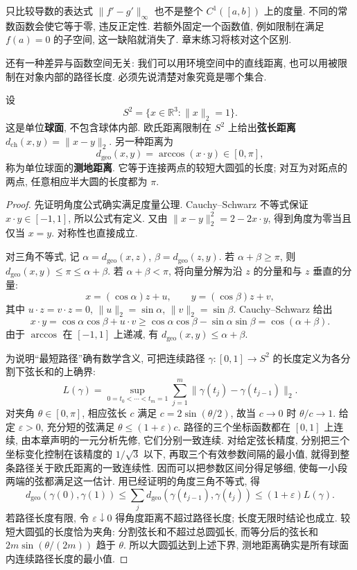只比较导数的表达式 $\lVert f'-g'\rVert_\infty$ 也不是整个 $C^1([a,b])$ 上的度量. 不同的常数函数会使它等于零, 违反正定性. 若额外固定一个函数值, 例如限制在满足 $f(a)=0$ 的子空间, 这一缺陷就消失了. 章末练习将核对这个区别.

\label{ch:metric:sphere}
还有一种差异与函数空间无关: 我们可以用环境空间中的直线距离, 也可以用被限制在对象内部的路径长度. 必须先说清楚对象究竟是哪个集合.

\begin{proposition}[单位球面上的两种距离]\label{ch:metric:sphere-example}
设
\[
 S^2=\{x\in\mathbb{R}^3:\lVert x\rVert_2=1\}.
\]
这是单位\textbf{球面}, 不包含球体内部. 欧氏距离限制在 $S^2$ 上给出\textbf{弦长距离} $d_{\mathrm{ch}}(x,y)=\lVert x-y\rVert_2$. 另一种距离为
\[
 d_{\mathrm{geo}}(x,y)=\arccos(x\cdot y)\in[0,\pi],
\]
称为单位球面的\textbf{测地距离}. 它等于连接两点的较短大圆弧的长度; 对互为对跖点的两点, 任意相应半大圆的长度都为 $\pi$.
\end{proposition}
\begin{proof}
先证明角度公式确实满足度量公理. Cauchy--Schwarz 不等式保证 $x\cdot y\in[-1,1]$, 所以公式有定义. 又由
$\lVert x-y\rVert_2^2=2-2x\cdot y$, 得到角度为零当且仅当 $x=y$. 对称性也直接成立.

对三角不等式, 记 $\alpha=d_{\mathrm{geo}}(x,z)$, $\beta=d_{\mathrm{geo}}(z,y)$. 若 $\alpha+\beta\ge\pi$, 则 $d_{\mathrm{geo}}(x,y)\le\pi\le\alpha+\beta$. 若 $\alpha+\beta<\pi$, 将向量分解为沿 $z$ 的分量和与 $z$ 垂直的分量:
\[
 x=(\cos\alpha)z+u,\qquad
 y=(\cos\beta)z+v,
\]
其中 $u\cdot z=v\cdot z=0$, $\lVert u\rVert_2=\sin\alpha$, $\lVert v\rVert_2=\sin\beta$. Cauchy--Schwarz 给出
\[
 x\cdot y=\cos\alpha\cos\beta+u\cdot v
 \ge\cos\alpha\cos\beta-\sin\alpha\sin\beta
 =\cos(\alpha+\beta).
\]
由于 $\arccos$ 在 $[-1,1]$ 上递减, 有 $d_{\mathrm{geo}}(x,y)\le\alpha+\beta$.

为说明``最短路径''确有数学含义, 可把连续路径 $\gamma:[0,1]\to S^2$ 的长度定义为各分割下弦长和的上确界:
\[
 L(\gamma)=\sup_{0=t_0<\cdots<t_m=1}
 \sum_{j=1}^m\lVert\gamma(t_j)-\gamma(t_{j-1})\rVert_2.
\]
对夹角 $\theta\in[0,\pi]$, 相应弦长 $c$ 满足 $c=2\sin(\theta/2)$, 故当 $c\to0$ 时 $\theta/c\to1$. 给定 $\varepsilon>0$, 充分短的弦满足 $\theta\le(1+\varepsilon)c$. 路径的三个坐标函数都在 $[0,1]$ 上连续, 由本章声明的一元分析先修, 它们分别一致连续. 对给定弦长精度, 分别把三个坐标变化控制在该精度的 $1/\sqrt3$ 以下, 再取三个有效参数间隔的最小值, 就得到整条路径关于欧氏距离的一致连续性. 因而可以把参数区间分得足够细, 使每一小段两端的弦都满足这一估计. 用已经证明的角度三角不等式, 得
\[
 d_{\mathrm{geo}}(\gamma(0),\gamma(1))
 \le\sum_jd_{\mathrm{geo}}(\gamma(t_{j-1}),\gamma(t_j))
 \le(1+\varepsilon)L(\gamma).
\]
若路径长度有限, 令 $\varepsilon\downarrow0$ 得角度距离不超过路径长度; 长度无限时结论也成立. 较短大圆弧的长度恰为夹角: 分割弦长和不超过总圆弧长, 而等分后的弦长和 $2m\sin(\theta/(2m))$ 趋于 $\theta$. 所以大圆弧达到上述下界, 测地距离确实是所有球面内连续路径长度的最小值.
\end{proof}

